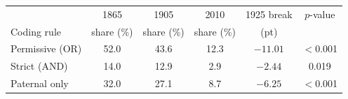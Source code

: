 \begin{tabular}{lccccc}
\toprule
 & 1865 & 1905 & 2010 & 1925 break & $p$-value \\
Coding rule & share (\%) & share (\%) & share (\%) & (pt) & \\
\midrule
Permissive (OR) & 52.0 & 43.6 & 12.3 & $-11.01$ & $<$0.001 \\
Strict (AND) & 14.0 & 12.9 & 2.9 & $-2.44$ & 0.019 \\
Paternal only & 32.0 & 27.1 & 8.7 & $-6.25$ & $<$0.001 \\
\bottomrule
\end{tabular}
